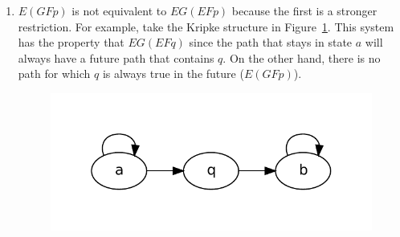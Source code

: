 \documentclass{article}
\begin{document}
\begin{enumerate}
\begin{enumerate}
      Claim: Any system that satisfies the CTL formula also satisfies the LTL formula.
\begin{proof}
  Assume that we have a system $S$ that satisfies $AF AG p$.  Let $z$ be an arbitrary path in the infinite computation tree of $S$.  Since we know that $F AG p$ holds for all paths in $S$, it also must hold for $z$.  Now let us consider the future state in $z$, call it $sf$, for which $AG p$ holds.  We know that all paths originating from $sf$ have the property $G p$.  In particular, so does the path that coincides with $z$.  Thus the entire path $z$ satisfies $FG p$, with the future state being $sf$.
\end{proof}
\item
$E(GF p)$ is not equivalent to $EG(EF p)$ because the first is a stronger restriction.  For example, take the Kripke structure in Figure~\ref{fig:p2b1}. This system has the property that $EG(EF q)$ since the path that stays in state $a$ will always have a future path that contains $q$.  On the other hand, there is no path for which $q$ is always true in the future ($E(GF p)$).
\begin{figure}
  \begin{center}
    \includegraphics[scale=0.5]{p2b1}
  \end{center}
  \label{fig:p2b1}
\end{figure}


\end{enumerate}
\end{enumerate}
\end{document}
